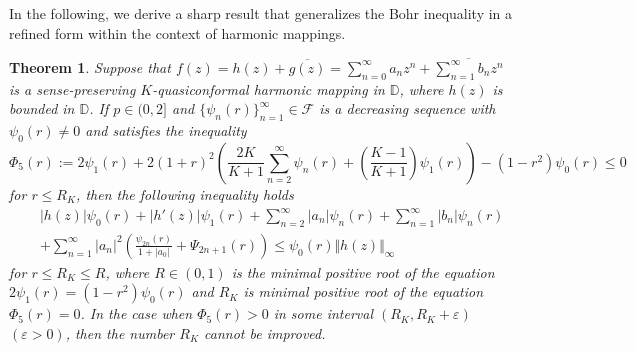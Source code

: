 \documentclass[11pt,reqno]{amsart}
\newtheorem{theo}{Theorem}[section]
\newtheorem{open problem}{Open problem}[section]
\newcommand{\F}{{\mathcal{F}}}
\newcommand{\ol}{\overline}
\newcommand{\be}{\begin{equation}}
\newcommand{\ee}{\end{equation}}
\newcommand{\beas}{\begin{eqnarray*}}
\newcommand{\eeas}{\end{eqnarray*}}
\renewcommand{\epsilon}{\varepsilon}
\numberwithin{equation}{section}
\begin{document}
In the following, we derive a sharp result that generalizes the Bohr inequality in a refined form within the context of harmonic mappings.
\begin{theo}\label{T3} Suppose that $f(z)=h(z)+\ol{g(z)}=\sum_{n=0}^\infty a_n z^n+\ol{\sum_{n=1}^\infty b_n z^n}$ is a sense-preserving $K$-quasiconformal harmonic mapping in $\mathbb{D}$, where $h(z)$ is bounded in $\mathbb{D}$. If $p\in(0,2]$ and $\{\psi_n(r)\}_{n=1}^\infty\in\F$ is a decreasing sequence with $\psi_0(r)\not=0$ and satisfies the inequality
\be\label{t3} 
\Phi_5(r):=2\psi_1(r)+2(1+r)^2\left(\frac{2K}{K+1}\sum_{n=2}^\infty \psi_n(r)+\left(\frac{K-1}{K+1}\right)\psi_1(r)\right)-(1-r^2)\psi_0(r)\leq 0\ee
for $ r\leq R_{K}$, then the following inequality holds 
\beas &&|h(z)|\psi_0(r)+|h'(z)|\psi_1(r)+\sum_{n=2}^\infty |a_n| \psi_n(r)+\sum_{n=1}^\infty |b_n| \psi_n(r)\\[2mm]
&&+\sum_{n=1}^\infty |a_n|^2\left(\frac{\psi_{2n}(r)}{1+|a_0|}+\Psi_{2n+1}(r)\right)\leq \psi_0(r)\Vert h(z)\Vert_\infty\eeas
for $ r\leq R_{K}\leq R$, where $R\in(0,1)$ is the minimal positive root of the equation $2\psi_1(r)=\left(1-r^2\right)\psi_0(r)$
 and $R_{K}$ is minimal positive root of the equation $\Phi_5(r)=0$.
In the case when $\Phi_5(r)>0$ in some interval $(R_{K}, R_{K}+\epsilon)$ $(\epsilon>0)$, then the number $R_{K}$ cannot be improved.
\end{theo}
\end{document}
